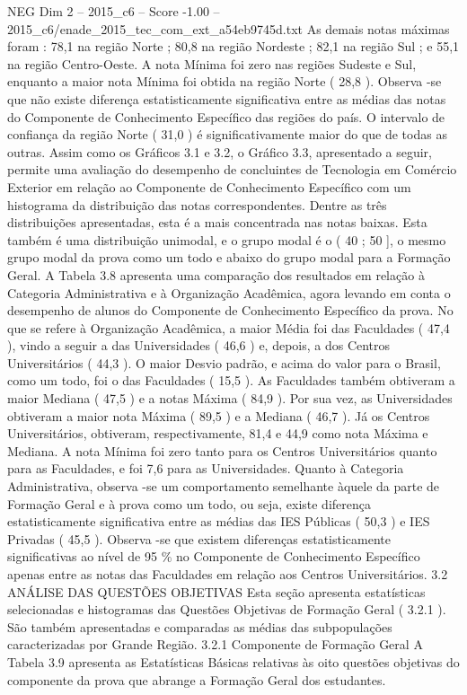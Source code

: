 \begin{textsample}{NEG Dim 2 – 2015\_c6 – Score -1.00 – 2015\_c6/enade\_2015\_tec\_com\_ext\_a54eb9745d.txt}
As demais notas máximas foram : 78,1 na região Norte ; 80,8 na região Nordeste ; 82,1 na região Sul ; e 55,1 na região Centro-Oeste.
A nota Mínima foi zero nas regiões Sudeste e Sul, enquanto a maior nota Mínima foi obtida na região Norte ( 28,8 ).
Observa -se que não existe diferença estatisticamente significativa entre as médias das notas do Componente de Conhecimento Específico das regiões do país.
O intervalo de confiança da região Norte ( 31,0 ) é significativamente maior do que de todas as outras.
Assim como os Gráficos 3.1 e 3.2, o Gráfico 3.3, apresentado a seguir, permite uma avaliação do desempenho de concluintes de Tecnologia em Comércio Exterior em relação ao Componente de Conhecimento Específico com um histograma da distribuição das notas correspondentes.
Dentre as três distribuições apresentadas, esta é a mais concentrada nas notas baixas.
Esta também é uma distribuição unimodal, e o grupo modal é o ( 40 ; 50 ], o mesmo grupo modal da prova como um todo e abaixo do grupo modal para a Formação Geral.
A Tabela 3.8 apresenta uma comparação dos resultados em relação à Categoria Administrativa e à Organização Acadêmica, agora levando em conta o desempenho de alunos do Componente de Conhecimento Específico da prova.
No que se refere à Organização Acadêmica, a maior Média foi das Faculdades ( 47,4 ), vindo a seguir a das Universidades ( 46,6 ) e, depois, a dos Centros Universitários ( 44,3 ).
O maior Desvio padrão, e acima do valor para o Brasil, como um todo, foi o das Faculdades ( 15,5 ).
As Faculdades também obtiveram a maior Mediana ( 47,5 ) e a notas Máxima ( 84,9 ).
Por sua vez, as Universidades obtiveram a maior nota Máxima ( 89,5 ) e a Mediana ( 46,7 ).
Já os Centros Universitários, obtiveram, respectivamente, 81,4 e 44,9 como nota Máxima e Mediana.
A nota Mínima foi zero tanto para os Centros Universitários quanto para as Faculdades, e foi 7,6 para as Universidades.
Quanto à Categoria Administrativa, observa -se um comportamento semelhante àquele da parte de Formação Geral e à prova como um todo, ou seja, existe diferença estatisticamente significativa entre as médias das IES Públicas ( 50,3 ) e IES Privadas ( 45,5 ).
Observa -se que existem diferenças estatisticamente significativas ao nível de 95 \% no Componente de Conhecimento Específico apenas entre as notas das Faculdades em relação aos Centros Universitários. 3.2 ANÁLISE DAS QUESTÕES OBJETIVAS Esta seção apresenta estatísticas selecionadas e histogramas das Questões Objetivas de Formação Geral ( 3.2.1 ).
São também apresentadas e comparadas as médias das subpopulações caracterizadas por Grande Região. 3.2.1 Componente de Formação Geral A Tabela 3.9 apresenta as Estatísticas Básicas relativas às oito questões objetivas do componente da prova que abrange a Formação Geral dos estudantes.

\end{textsample}
